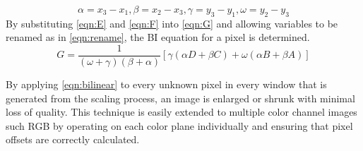 \begin{equation}
  \alpha = x_3 - x_1, 
  \beta = x_2 - x_3, 
  \gamma = y_3 - y_1, 
  \omega = y_2 - y_3
  \label{eqn:rename}
\end{equation}
By substituting \eqref{eqn:E} and \eqref{eqn:F} into \eqref{eqn:G} and allowing variables to be renamed as in \eqref{eqn:rename}, the BI equation for a pixel is determined.
\begin{equation}
  G = \frac{1}{(\omega + \gamma)(\beta + \alpha)}[\gamma(\alpha D + \beta C) + \omega(\alpha B + \beta A)]
  \label{eqn:bilinear}
\end{equation}

By applying \eqref{eqn:bilinear} to every unknown pixel in every window that is generated from the scaling process, an image is enlarged or shrunk with minimal loss of quality.  This technique is easily extended to multiple color channel images such RGB by operating on each color plane individually and ensuring that pixel offsets are correctly calculated.
